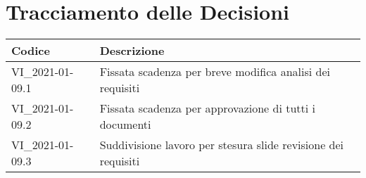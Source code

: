 \section*{Tracciamento delle Decisioni}

\begin{center}
	\begin{longtable}{|p{3.5cm}|p{11cm}|}
		\hline
		\rowcolor{lighter-grayer}
		\textbf{Codice} & \textbf{Descrizione} \\
		\hline
		\endfirsthead

		\hline
		VI\_2021-01-09.1 & Fissata scadenza per breve modifica analisi dei requisiti \\
		VI\_2021-01-09.2 & Fissata scadenza per approvazione di tutti i documenti \\
		VI\_2021-01-09.3 & Suddivisione lavoro per stesura slide revisione dei requisiti \\
		\hline
	\end{longtable}
\end{center}